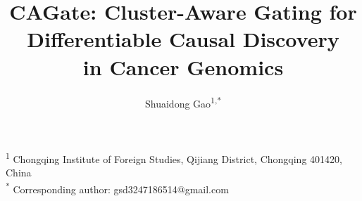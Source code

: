 \documentclass[12pt,a4paper]{article}
\title{\textbf{CAGate: Cluster-Aware Gating for Differentiable Causal Discovery\\in Cancer Genomics}}
\author{Shuaidong Gao\textsuperscript{1,*}}
\date{}
\begin{document}
\maketitle









\begin{center}




\textsuperscript{1} Chongqing Institute of Foreign Studies, Qijiang District, Chongqing 401420, China \\




\textsuperscript{*} Corresponding author: gsd3247186514@gmail.com




\end{center}









\bigskip









\end{document}
